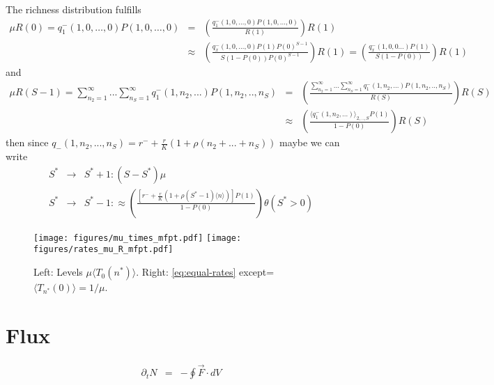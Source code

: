 \documentclass[%
 amsmath,amssymb,
 reprint,%
]{revtex4-2}
\begin{document}
\begin{widetext}
The richness distribution fulfills
\begin{eqnarray}
    \mu R(0)=q_1^-(1,0,\dots,0)P(1,0,\dots , 0)&=& \left(\frac{q_1^-(1,0,\dots,0)P(1,0,\dots , 0)}{R(1)}\right)R(1)\\ \nonumber &\approx& \left(\frac{q_x^-(1,0,\dots,0)P(1)P(0)^{S-1}}{S(1-P(0))P(0)^{S-1}}\right)R(1) = \left(\frac{q_x^-(1,0,0...)P(1)}{S(1-P(0))}\right)R(1)
\end{eqnarray}
and 
\begin{eqnarray}
    \mu R(S-1)=\sum_{n_2=1}^{\infty}...\sum_{n_S=1}^{\infty}q_1^-(1,n_2,...)P(1,n_2,.., n_S)&=& \left(\frac{\sum_{n_2=1}^{\infty}...\sum_{n_S=1}^{\infty}q_1^-(1,n_2,...)P(1,n_2,.., n_S)}{R(S)}\right)R(S) \nonumber \\ 
    &\approx&  \left(\frac{\langle  q_1^-(1,n_2,...) \rangle_{2,..,S} P(1) }{1-P(0)}\right)R(S)
\end{eqnarray}
then since $q_-(1,n_2,...,n_S)=r^-+\frac{r}{K}\left(1+\rho (n_2 + ...+ n_S)\right)$ maybe we can write
\begin{eqnarray}
    S^* &\rightarrow& S^*+1:  (S-S^*)\mu \\ \nonumber
     S^* &\rightarrow& S^*-1: \approx \left(\frac{\left[r^-+\frac{r}{K}(1+\rho (S^*-1)\langle n \rangle ) \right]P(1)}{1-P(0)}\right)\theta(S^*>0) 
\end{eqnarray}

\begin{figure}[h]
\texttt{[image: figures/mu\_times\_mfpt.pdf]}
\texttt{[image: figures/rates\_mu\_R\_mfpt.pdf]}
\caption{Left: Levels $\mu \langle T_0(n^*) \rangle$. Right: \ref{eq:equal-rates} except= $\langle T_{n^*}(0) \rangle=1/\mu$.}
\label{det_eigvec}
\end{figure}




\section{Flux}

\begin{eqnarray}
    \partial_t N &=& - \oint  {\vec{F}}\cdot dV
\end{eqnarray}


\end{widetext}
\end{document}
